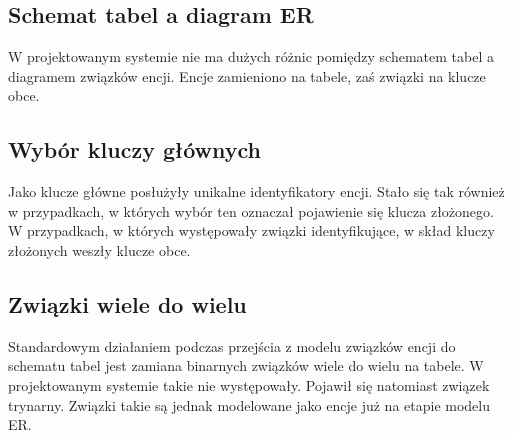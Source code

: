 \subsection[Schemat tabel a diagram ER][Schemat tabel a diagram ER]{Schemat tabel a diagram ER}
W projektowanym systemie nie ma dużych różnic pomiędzy schematem tabel a diagramem związków encji.
Encje zamieniono na tabele, zaś związki na klucze obce. 

\subsection[Wybór kluczy głównych][Wybór kluczy głównych]{Wybór kluczy głównych}
Jako klucze główne posłużyły unikalne identyfikatory encji. Stało się tak również w przypadkach, w których wybór ten oznaczał pojawienie się klucza złożonego. W przypadkach, w których występowały związki identyfikujące, w skład kluczy złożonych weszły klucze obce.

\subsection[Związki wiele do wielu][Związki wiele do wielu]{Związki wiele do wielu}
Standardowym działaniem podczas przejścia z modelu związków encji do schematu tabel jest zamiana binarnych związków wiele do wielu na tabele. W projektowanym systemie takie nie występowały. Pojawił się natomiast związek trynarny. Związki takie są jednak modelowane jako encje już na etapie modelu ER.

